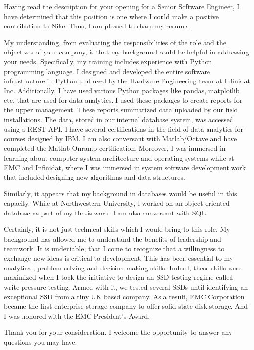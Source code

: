 \documentclass[busletter,dateno]{newlfm}
\begin{document}
\begin{newlfm}
Having read the description for your opening for a Senior Software Engineer,
I have determined that this position is one where I could make a positive
contribution to Nike. Thus, I am pleased to share my resume.

My understanding, from evaluating the responsibilities of the role and the
objectives of your company, is that my background could be helpful in
addressing your needs. Specifically, my training includes experience
with Python programming language. I designed and developed the entire software
infrastructure in Python and used by the Hardware Engineering team at Infinidat Inc.
Additionally, I have used various Python
packages like pandas, matplotlib etc. that are used for data analytics. I used
these packages to create reports for the upper management. These reports
summarized data uploaded by our field installations. The data, stored in our internal
database system, was accessed using a REST API. I have
several certifications in the field of data analytics for courses designed by IBM.
I am also conversant with Matlab/Octave and have completed the Matlab Onramp
certification. Moreover, I was immersed in learning about computer system 
architecture and operating systems while at EMC and Infinidat, where I was
immersed in system software development work that included designing new
algorithms and data structures.

Similarly, it appears that my background in databases would be
useful in this capacity. While at Northwestern University, I worked on an
object-oriented database as part of my thesis work. I am also conversant with
SQL.

Certainly, it is not just technical skills which I would bring to this role.
My background has allowed me to understand the benefits of leadership and
teamwork. It is undeniable, that I come to recognize that a willingness to
exchange new ideas is critical to development. This has been essential to my
analytical, problem-solving and decision-making skills. Indeed, these skills
were maximized when I took the initiative to design an SSD testing regime
called write-pressure testing. Armed with it, we tested several SSDs until
identifying an exceptional SSD from a tiny UK based company. As a result,
EMC Corporation became the first enterprise storage company to offer solid 
state disk storage. And I was honored with the EMC President's Award.

Thank you for your consideration.  I welcome the opportunity to answer any
questions you may have. 
\end{newlfm}
\end{document}
